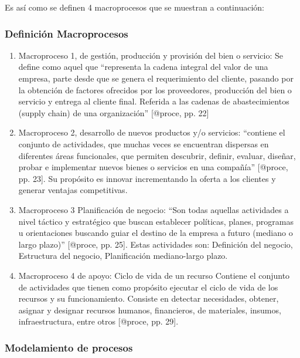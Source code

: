 \documentclass[
]{article}
\begin{document}
Es así como se definen 4 macroprocesos que se muestran a continuación:

\hypertarget{definiciuxf3n-macroprocesos}{%
\subsubsection{Definición
Macroprocesos}\label{definiciuxf3n-macroprocesos}}

\begin{enumerate}
\def\labelenumi{\arabic{enumi}.}
\item
  Macroproceso 1, de gestión, producción y provisión del bien o
  servicio: Se define como aquel que ``representa la cadena integral del
  valor de una empresa, parte desde que se genera el requerimiento del
  cliente, pasando por la obtención de factores ofrecidos por los
  proveedores, producción del bien o servicio y entrega al cliente
  final. Referida a las cadenas de abastecimientos (supply chain) de una
  organización'' {[}@proce, pp. 22{]}
\item
  Macroproceso 2, desarrollo de nuevos productos y/o servicios:
  ``contiene el conjunto de actividades, que muchas veces se encuentran
  dispersas en diferentes áreas funcionales, que permiten descubrir,
  definir, evaluar, diseñar, probar e implementar nuevos bienes o
  servicios en una compañía'' {[}@proce, pp. 23{]}. Su propósito es
  innovar incrementando la oferta a los clientes y generar ventajas
  competitivas.
\item
  Macroproceso 3 Planificación de negocio: ``Son todas aquellas
  actividades a nivel táctico y estratégico que buscan establecer
  políticas, planes, programas u orientaciones buscando guiar el destino
  de la empresa a futuro (mediano o largo plazo)'' {[}@proce, pp. 25{]}.
  Estas actividades son: Definición del negocio, Estructura del negocio,
  Planificación mediano-largo plazo.
\item
  Macroproceso 4 de apoyo: Ciclo de vida de un recurso Contiene el
  conjunto de actividades que tienen como propósito ejecutar el ciclo de
  vida de los recursos y su funcionamiento. Consiste en detectar
  necesidades, obtener, asignar y designar recursos humanos,
  financieros, de materiales, insumos, infraestructura, entre otros
  {[}@proce, pp. 29{]}.
\end{enumerate}

\hypertarget{modelamiento-de-procesos}{%
\subsubsection{Modelamiento de
procesos}\label{modelamiento-de-procesos}}
\end{document}
